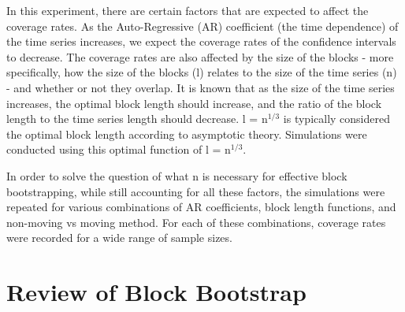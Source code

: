 \documentclass[12pt, letterpaper, titlepage]{article}
\begin{document}
In this experiment, there are certain factors that are expected to affect the coverage
rates. As the Auto-Regressive (AR) coefficient (the time dependence) of the time series 
increases,
we expect the coverage rates of the confidence intervals to decrease.
The coverage rates are also affected by the size of the blocks - more specifically,
how the size of the blocks (l) relates to the size of the time series (n) - 
and whether or not they overlap. It is known that as the size of the time series 
increases, the optimal block length should increase, and the ratio of the block length to 
the time series length should decrease. l = n$^{1/3}$ is typically considered the optimal 
block length according to asymptotic theory. \citep{buhlmann1999block} Simulations were conducted using this optimal function of l = n$^{1/3}$. 

In order to solve the question of what n is necessary for effective block bootstrapping,
while still accounting for all these factors, the simulations were repeated for
various combinations of AR coefficients, block length functions, and non-moving vs moving method. For each of these combinations, coverage rates were recorded for a wide range of sample sizes.

\section{Review of Block Bootstrap}
\label{sec:blkbootreview}
\end{document}
